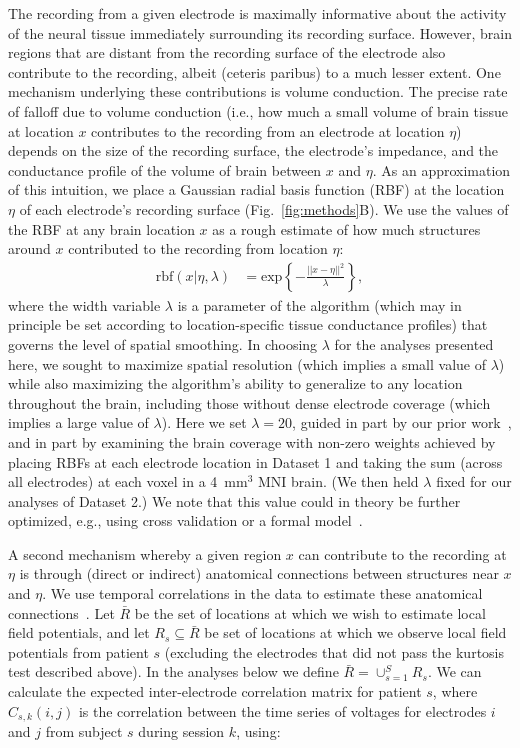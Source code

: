 \message{ !name(main.tex)}\documentclass[11pt]{article}
\begin{document}
The recording from a given electrode is maximally informative about
the activity of the neural tissue immediately surrounding its
recording surface.  However, brain regions that are distant from the
recording surface of the electrode also contribute to the recording,
albeit (ceteris paribus) to a much lesser extent.  One mechanism
underlying these contributions is volume conduction.  The precise rate
of falloff due to volume conduction (i.e., how much a small volume of
brain tissue at location $x$ contributes to the recording from an
electrode at location $\eta$) depends on the size of the recording
surface, the electrode's impedance, and the conductance profile of the
volume of brain between $x$ and $\eta$.  As an approximation of this
intuition, we place a Gaussian radial basis function (RBF) at the
location $\eta$ of each electrode's recording surface
(Fig.~\ref{fig:methods}B).  We use the values of the RBF at any brain
location $x$ as a rough estimate of how much structures around $x$
contributed to the recording from location $\eta$:
\begin{align}
  \mathrm{rbf}(x|\eta,\lambda) & =
  \mathrm{exp}\left\{ -\frac{||x - \eta||^2}{\lambda} \right\},\label{eqn:rbf}
\end{align}
where the width variable $\lambda$ is a parameter of the algorithm
(which may in principle be set according to location-specific tissue
conductance profiles) that governs the level of spatial smoothing.  In
choosing $\lambda$ for the analyses presented here, we sought to
maximize spatial resolution (which implies a small value of $\lambda$)
while also maximizing the algorithm's ability to generalize to any
location throughout the brain, including those without dense electrode
coverage (which implies a large value of $\lambda$).  Here we set
$\lambda = 20$, guided in part by our prior work~\citep{MannEtal14b,
  MannEtal18}, and in part by examining the brain coverage with
non-zero weights achieved by placing RBFs at each electrode location
in Dataset 1 and taking the sum (across all electrodes) at each voxel
in a 4~mm$^3$ MNI brain.  (We then held $\lambda$ fixed for our
analyses of Dataset 2.)  We note that this value could in theory be
further optimized, e.g., using cross validation or a formal
model~\citep[e.g.,][]{MannEtal18}.

A second mechanism whereby a given region $x$ can contribute to the
recording at $\eta$ is through (direct or indirect) anatomical
connections between structures near $x$ and $\eta$.  We use temporal
correlations in the data to estimate these anatomical
connections~\citep{BeckEtal18}.  Let $\bar{R}$ be the set of locations
at which we wish to estimate local field potentials, and let
$R_{s} \subseteq \bar{R}$ be set of locations at which we observe local
field potentials from patient $s$ (excluding the electrodes that did
not pass the kurtosis test described above). In the analyses below we
define $\bar{R} = \cup_{s=1}^S R_s$.  We can calculate the expected
inter-electrode correlation matrix for patient $s$, where
$C_{s,k}(i,j)$ is the correlation between the time series of voltages
for electrodes $i$ and $j$ from subject $s$ during session $k$, using:
\end{document}
